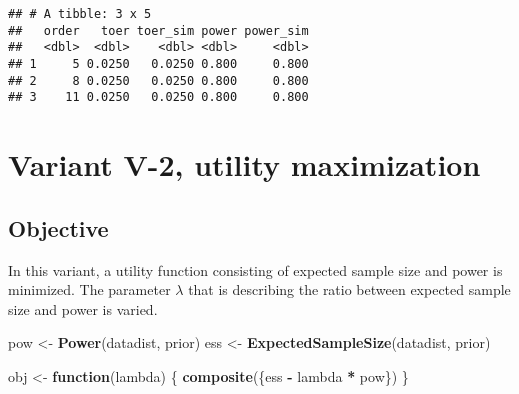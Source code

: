 \documentclass[]{book}
\newenvironment{Shaded}{\begin{snugshade}}{\end{snugshade}}
\newcommand{\ControlFlowTok}[1]{\textcolor[rgb]{0.13,0.29,0.53}{\textbf{#1}}}
\newcommand{\DecValTok}[1]{\textcolor[rgb]{0.00,0.00,0.81}{#1}}
\newcommand{\KeywordTok}[1]{\textcolor[rgb]{0.13,0.29,0.53}{\textbf{#1}}}
\newcommand{\NormalTok}[1]{#1}
\newcommand{\OperatorTok}[1]{\textcolor[rgb]{0.81,0.36,0.00}{\textbf{#1}}}
\newcommand{\StringTok}[1]{\textcolor[rgb]{0.31,0.60,0.02}{#1}}
\begin{document}
\begin{Shaded}
\begin{Highlighting}[]
{{{{\NormalTok{  testthat}\OperatorTok{::}\KeywordTok{expect_true}\NormalTok{(}\KeywordTok{all}\NormalTok{(.}\OperatorTok{$}\NormalTok{power     }\OperatorTok{>=}\StringTok{ }\NormalTok{min_power }\OperatorTok{*}\StringTok{ }\NormalTok{(}\DecValTok{1} \OperatorTok{-}\StringTok{ }\NormalTok{tol)))}
\NormalTok{  testthat}\OperatorTok{::}\KeywordTok{expect_true}\NormalTok{(}\KeywordTok{all}\NormalTok{(.}\OperatorTok{$}\NormalTok{power_sim }\OperatorTok{>=}\StringTok{ }\NormalTok{min_power }\OperatorTok{*}\StringTok{ }\NormalTok{(}\DecValTok{1} \OperatorTok{-}\StringTok{ }\NormalTok{tol))) \}}
\end{Highlighting}
\end{Shaded}

\begin{verbatim}
## # A tibble: 3 x 5
##   order   toer toer_sim power power_sim
##   <dbl>  <dbl>    <dbl> <dbl>     <dbl>
## 1     5 0.0250   0.0250 0.800     0.800
## 2     8 0.0250   0.0250 0.800     0.800
## 3    11 0.0250   0.0250 0.800     0.800
\end{verbatim}

\hypertarget{variantV_2}{%
\section{Variant V-2, utility maximization}\label{variantV_2}}

\hypertarget{objective-11}{%
\subsection{Objective}\label{objective-11}}

In this variant, a utility function consisting of expected sample size and
power is minimized.
The parameter \(\lambda\) that is describing the ratio between expected
sample size and power is varied.

\begin{Shaded}
\begin{Highlighting}[]
\NormalTok{pow <-}\StringTok{ }\KeywordTok{Power}\NormalTok{(datadist, prior)}
\NormalTok{ess <-}\StringTok{ }\KeywordTok{ExpectedSampleSize}\NormalTok{(datadist, prior)}

\NormalTok{obj <-}\StringTok{ }\ControlFlowTok{function}\NormalTok{(lambda) \{}
  \KeywordTok{composite}\NormalTok{(\{ess }\OperatorTok{-}\StringTok{ }\NormalTok{lambda }\OperatorTok{*}\StringTok{ }\NormalTok{pow\})}
\NormalTok{\}}
\end{Highlighting}
\end{Shaded}
\end{document}
